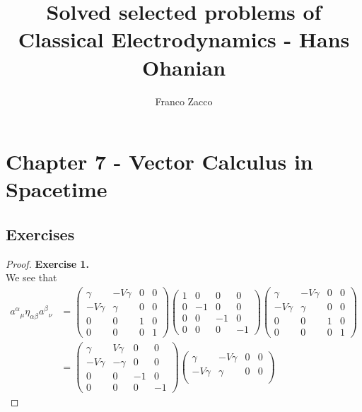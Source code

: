 \documentclass[11pt]{article}
\title{\textbf{Solved selected problems of Classical Electrodynamics - Hans Ohanian}}
\author{Franco Zacco}
\date{}
\theoremstyle{definition}
\begin{document}
\maketitle
\thispagestyle{empty}

\section*{Chapter 7 - Vector Calculus in Spacetime}

\subsection*{Exercises}

\begin{proof}{\textbf{Exercise 1.}}\\
We see that
\begin{align*}
    {a^\alpha}_\mu \eta_{\alpha\beta} {a^\beta}_\nu
    &= \begin{pmatrix}
        \gamma & -V\gamma & 0 & 0 \\
        -V\gamma & \gamma & 0 & 0 \\
        0 & 0 & 1 & 0 \\
        0 & 0 & 0 & 1
    \end{pmatrix}
    \begin{pmatrix}
        1 & 0 & 0 & 0 \\
        0 & -1 & 0 & 0 \\
        0 & 0 & -1 & 0 \\
        0 & 0 & 0 & -1
    \end{pmatrix}
    \begin{pmatrix}
        \gamma & -V\gamma & 0 & 0 \\
        -V\gamma & \gamma & 0 & 0 \\
        0 & 0 & 1 & 0 \\
        0 & 0 & 0 & 1
    \end{pmatrix} \\
    &= \begin{pmatrix}
        \gamma & V\gamma & 0 & 0 \\
        -V\gamma & -\gamma & 0 & 0 \\
        0 & 0 & -1 & 0 \\
        0 & 0 & 0 & -1
    \end{pmatrix}
    \begin{pmatrix}
        \gamma & -V\gamma & 0 & 0 \\
        -V\gamma & \gamma & 0 & 0 \\

\end{pmatrix}
\end{align*}
\end{proof}
\end{document}
